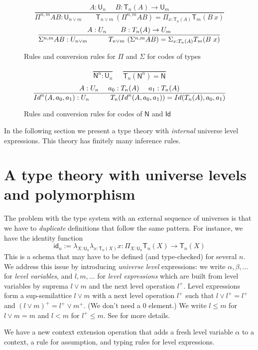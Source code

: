 \documentclass[a4paper,UKenglish,cleveref, autoref, thm-restate]{lipics-v2021}
\newcommand{\Id}{\mathsf{Id}}
\newcommand{\id}{\mathsf{id}}
\newcommand{\NN}{\mathsf{N}}
\newcommand{\UU}{\mathsf{U}}
\newcommand{\mylam}[3]{\lambda_{#1:#2}#3}
\newcommand{\mypi}[3]{\Pi_{#1:#2}#3}
\newcommand{\mysig}[3]{\Sigma_{#1:#2}#3}
\newcommand{\sapp}[2]{{#1(#2)}} %
\newcommand{\Idapp}[3]{\sapp{\Id}{#1,#2,#3}}
\newcommand{\Idnapp}[4]{\sapp{\Id^#4}{#1,#2,#3}}
\newcommand{\T}{\mathsf{T}}
\begin{document}
\begin{figure}[H]
  \caption{Rules and conversion rules for $\Pi$ and $\Sigma$ for codes of types}\label{fig:PiSigU}
$$
\frac{A:\UU_{n}~~~~~~B:\T_{n}(A)\rightarrow \UU_{m}}
     {\Pi^{n,m} A B:\UU_{n\vee m}~~~~~~~~~
      \T_{n\vee m}~(\Pi^{n,m} A B) = \mypi{x}{\T_{n}(A)}{ \T_{m}(B~x)}}
$$
$$
\frac{A:\UU_{n}~~~~~~B:\T_{n}(A)\rightarrow \UU_{m}}
     {\Sigma^{n,m} A B:\UU_{n\vee m}~~~~~~~~~
     \T_{n\vee m}~(\Sigma^{n,m} A B) = \mysig {x}{\T_{n}(A)}{ \T_{m}(B~x)}}
\belowdisplayshortskip -1pt
$$
\end{figure}

\begin{figure}[H]
\caption{Rules and conversion rules for codes of $\NN$ and $\Id$}\label{fig:NIdU}
$$
\frac{}{\NN^{n}:\UU_{n}}~~~~~~\frac{}{\T_{n}(\NN^{n}) = \NN}
$$
$$
\frac{A:\UU_n~~~~a_0:\T_n(A)~~~~a_1:\T_n(A)}
{\Idnapp{A}{a_0}{a_1}{n}:\UU_n ~~~~~~~~~ \T_n(\Idnapp{A}{a_0}{a_1}{n}) = \Idapp{{\T_n(A)}}{a_0}{a_1} }
\belowdisplayshortskip 1pt
$$
\end{figure}

In the following section we present a type theory with \emph{internal}
universe level expressions. This theory has finitely many inference rules.

 \section{A type theory with universe levels and polymorphism }\label{sec:internal}

The problem with the type system with an external sequence of universes
is that we have to \emph{duplicate} definitions that follow
the same pattern. For instance, we have the identity function
$$
\id_n := \mylam{X}{\UU_n}{\mylam{x}{\T_n(X)}{x}} : \mypi{X}{\UU_n}{\T_n(X)\rightarrow \T_n(X)}
$$
This is a schema that
may have to be defined (and type-checked) for several $n$.
We address this issue by introducing \emph{universe level}
expressions: we write $\alpha,\beta,\dots$
for \emph{level variables}, and $l,m,\dots$ for
\emph{level expressions} which are built from level variables
by suprema $l \vee m$ and the next level operation $l^+$.
Level expressions form a sup-semilattice $l\vee m$
with a next level operation $l^+$ such that $l \vee l^+ = l^+$
and $(l\vee m)^+ = l^+\vee m^+$. (We don't need a $0$ element.)
We write $l\leqslant m$ for $l\vee m = m$ and $l<m$ for $l^+\leqslant m$.
See \cite{bezem-coquand:lattices} for more details.

We have a new context extension operation that adds a fresh level variable
$\alpha$ to a context, a rule for assumption, and typing rules
for level expressions.
\end{document}
